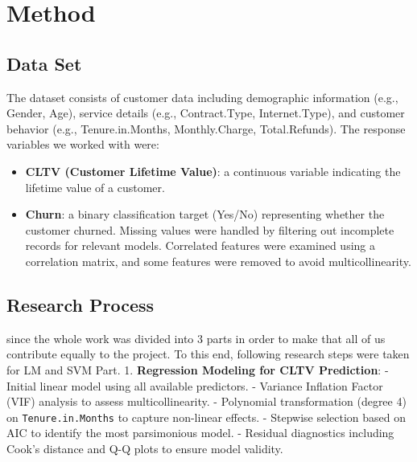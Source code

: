 \documentclass[
]{article}
\providecommand{\tightlist}{%
  \setlength{\itemsep}{0pt}\setlength{\parskip}{0pt}}
\begin{document}
\hypertarget{method}{%
\section{Method}\label{method}}

\hypertarget{data-set}{%
\subsection{Data Set}\label{data-set}}

The dataset consists of customer data including demographic information
(e.g., Gender, Age), service details (e.g., Contract.Type,
Internet.Type), and customer behavior (e.g., Tenure.in.Months,
Monthly.Charge, Total.Refunds). The response variables we worked with
were:

\begin{itemize}
\tightlist
\item
  \textbf{CLTV (Customer Lifetime Value)}: a continuous variable
  indicating the lifetime value of a customer.
\item
  \textbf{Churn}: a binary classification target (Yes/No) representing
  whether the customer churned. Missing values were handled by filtering
  out incomplete records for relevant models. Correlated features were
  examined using a correlation matrix, and some features were removed to
  avoid multicollinearity.
\end{itemize}

\hypertarget{research-process}{%
\subsection{Research Process}\label{research-process}}

since the whole work was divided into 3 parts in order to make that all
of us contribute equally to the project. To this end, following research
steps were taken for LM and SVM Part. 1. \textbf{Regression Modeling for
CLTV Prediction}: - Initial linear model using all available predictors.
- Variance Inflation Factor (VIF) analysis to assess multicollinearity.
- Polynomial transformation (degree 4) on \texttt{Tenure.in.Months} to
capture non-linear effects. - Stepwise selection based on AIC to
identify the most parsimonious model. - Residual diagnostics including
Cook's distance and Q-Q plots to ensure model validity.
\end{document}
